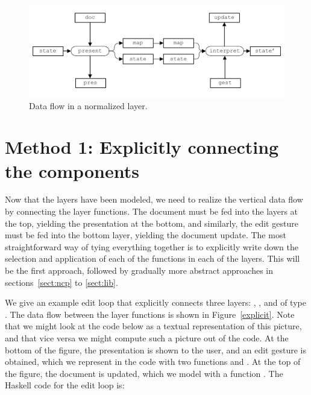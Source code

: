 \documentclass[preprint,natbib]{sigplanconf}
\begin{document}
\begin{figure}
\includegraphics[width=\columnwidth]{images/NormalizedLayer}
\caption{Data flow in a normalized layer.}\label{wrapped} 
\end{figure}

			
\section{Method 1: Explicitly connecting the components} \label{sect:simple}

Now that the layers have been modeled, we need to realize the vertical data flow by connecting the layer functions. The document must be fed into the layers at the top, yielding the presentation at the bottom, and similarly, the edit gesture must be fed into the bottom layer, yielding the document update. The most straightforward way of tying everything together is to explicitly write down the selection and application of each of the functions in each of the layers. This will be the first approach, followed by gradually more abstract approaches in sections~\ref{sect:ncp} to \ref{sect:lib}.

We give an example edit loop that explicitly connects three layers: , , and  of type . The data flow between the layer functions is shown in Figure~\ref{explicit}. Note that we might look at the code below as a textual representation of this picture, and that vice versa we might compute such a picture out of the code. At the bottom of the figure, the presentation is shown to the user, and an edit gesture is obtained, which we represent in the code with two functions  and . At the top of the figure, the document is updated, which we model with a function . The Haskell code for the edit loop is:
\end{document}
